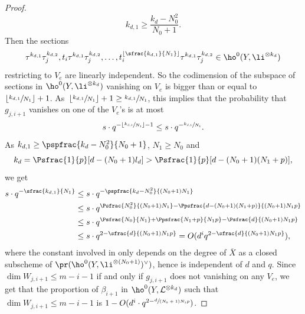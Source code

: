 \begin{proof}[Proof]
\[
k_{d,1}\geq \frac{k_d-N_0^2}{N_0+1}.
\]
Then the sections
\[
\tau^{k_{d,1}}\tau_j^{k_{d,2}}, t_i\tau^{k_{d,1}}\tau_j^{k_{d,2}},\dots, t_i^{\lfloor \sfrac{k_{d,1}}{N_1} \rfloor}\tau^{k_{d,1}}\tau_j^{k_{d,2}}\in \ho^0(Y, \li^{\otimes k_d})
\]
restricting to $V_e$ are linearly independent. So the codimension of the subspace of sections in $\ho^0(Y, \li^{\otimes k_d})$ vanishing on $V_e$ is bigger than or equal to $\lfloor \sfrac{k_{d,1}}{N_1} \rfloor+1$. As~$\lfloor \sfrac{k_{d,1}}{N_1} \rfloor+1\geq \sfrac{k_{d,1}}{N_1} $, this implies that the probability that $g_{j, i+1}$ vanishes on one of the $V_e$'s is at most
\[
s\cdot q^{-\lfloor \sfrac{k_{d,1}}{N_1} \rfloor-1}\leq s\cdot q^{-\sfrac{k_{d,1}}{N_1}}.
\]
As $k_{d,1}\geq \pspfrac{k_d-N_0^2}{N_0+1}$, $N_1\geq N_0$ and
\[
k_d=\Psfrac{1}{p}[d-(N_0+1)l_d]>\Psfrac{1}{p}[d-(N_0+1)(N_1+p)],
\]
we get
\begin{align*}
s\cdot q^{- \sfrac{k_{d,1}}{N_1}}&\leq s\cdot q^{-\pspfrac{k_d-N_0^2}{(N_0+1)N_1}}\\
&\leq s\cdot q^{\Psfrac{N_0^2}{(N_0+1)N_1}-\Ppsfrac{d-(N_0+1)(N_1+p)}{ (N_0+1)N_1p}}\\
&\leq s\cdot q^{\Psfrac{N_0}{N_1}+\Ppsfrac{N_1+p}{N_1p}-\Psfrac{d}{ (N_0+1)N_1p}}\\
&\leq s\cdot q^{2-\sfrac{d}{ (N_0+1)N_1p}}=O(d^i q^{2-\sfrac{d}{ (N_0+1)N_1p}}),
\end{align*}
where the constant involved in only depends on the degree of $\overline{X}$ as a closed subscheme of $\pr(\ho^0(Y, \li^{\otimes (N_0+1)})^{\vee})$, hence is independent of $d$ and $q$. Since $\dim W_{j,i+1} \leq m-i-1$ if and only if $g_{j,i+1}$ does not vanishing on any $V_e$, we get that the proportion of $\beta_{i+1}$ in $\ho^0(Y,\mathcal{L}^{\otimes k_d})$ such that $\dim W_{j,i+1} \leq m-i-1$ is $1-O(d^i\cdot q^{2-\sfrac{d}{(N_0+1)N_1p}})$.
\end{proof}

